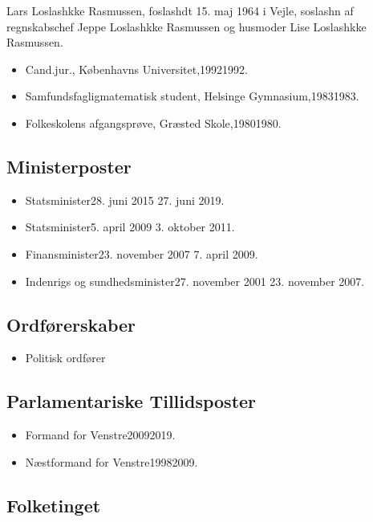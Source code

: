 \documentclass[11pt, a4paper]{awesome-cv}
\begin{document}
\makecvheader[R]
\makelettertitle
\begin{cvletter}
Lars Loslashkke Rasmussen, foslashdt 15. maj 1964 i Vejle, soslashn af regnskabschef Jeppe Loslashkke Rasmussen og husmoder Lise Loslashkke Rasmussen.

\begin{itemize}
\item Cand.jur., Københavns Universitet,19921992.
\item Samfundsfagligmatematisk student, Helsinge Gymnasium,19831983.
\item Folkeskolens afgangsprøve, Græsted Skole,19801980.
\end{itemize}
\subsection*{Ministerposter}
\begin{itemize}
\item Statsminister28. juni 2015  27. juni 2019.
\item Statsminister5. april 2009  3. oktober 2011.
\item Finansminister23. november 2007  7. april 2009.
\item Indenrigs og sundhedsminister27. november 2001  23. november 2007.
\end{itemize}
\subsection*{Ordførerskaber}
\begin{itemize}
\item Politisk ordfører
\end{itemize}
\subsection*{Parlamentariske Tillidsposter}
\begin{itemize}
\item Formand for Venstre20092019.
\item Næstformand for Venstre19982009.
\end{itemize}
\subsection*{Folketinget}

\end{cvletter}
\end{document}
